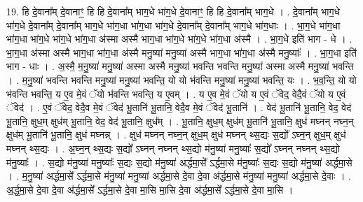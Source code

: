 \documentclass[17pt]{extarticle}
\begin{document}
19. हि दे॒वाना᳚म् दे॒वानाꣳ॒॒ हि हि दे॒वाना᳚म् भाग॒धे भा॑ग॒धे दे॒वानाꣳ॒॒ हि हि दे॒वाना᳚म् भाग॒धे । . दे॒वाना᳚म् भाग॒धे भा॑ग॒धे दे॒वाना᳚म् दे॒वाना᳚म् भाग॒धे भा॑ग॒धा भा॑ग॒धा भा॑ग॒धे दे॒वाना᳚म् दे॒वाना᳚म् भाग॒धे भा॑ग॒धाः । . भा॒ग॒धे भा॑ग॒धा भा॑ग॒धा भा॑ग॒धे भा॑ग॒धे भा॑ग॒धा अ॑स्मा अस्मै भाग॒धा भा॑ग॒धे भा॑ग॒धे भा॑ग॒धा अ॑स्मै । . भा॒ग॒धे इति॑ भाग - धे । . भा॒ग॒धा अ॑स्मा अस्मै भाग॒धा भा॑ग॒धा अ॑स्मै मनु॒ष्या॑ मनु॒ष्या॑ अस्मै भाग॒धा भा॑ग॒धा अ॑स्मै मनु॒ष्याः᳚ । . भा॒ग॒धा इति॑ भाग - धाः । . अ॒स्मै॒ म॒नु॒ष्या॑ मनु॒ष्या॑ अस्मा अस्मै मनु॒ष्या॑ भवन्ति भवन्ति मनु॒ष्या॑ अस्मा अस्मै मनु॒ष्या॑ भवन्ति । . म॒नु॒ष्या॑ भवन्ति भवन्ति मनु॒ष्या॑ मनु॒ष्या॑ भवन्ति॒ यो यो भ॑वन्ति मनु॒ष्या॑ मनु॒ष्या॑ भवन्ति॒ यः । . भ॒व॒न्ति॒ यो यो भ॑वन्ति भवन्ति॒ य ए॒व मे॒वं ॅयो भ॑वन्ति भवन्ति॒ य ए॒वम् । . य ए॒व मे॒वं ॅयो य ए॒वं ॅवेद॒ वेदै॒वं ॅयो य ए॒वं ॅवेद॑ । . ए॒वं ॅवेद॒ वेदै॒व मे॒वं ॅवेद॑ भू॒तानि॑ भू॒तानि॒ वेदै॒व मे॒वं ॅवेद॑ भू॒तानि॑ । . वेद॑ भू॒तानि॑ भू॒तानि॒ वेद॒ वेद॑ भू॒तानि॒ क्षुध॒म् क्षुध॑म् भू॒तानि॒ वेद॒ वेद॑ भू॒तानि॒ क्षुध᳚म् । . भू॒तानि॒ क्षुध॒म् क्षुध॑म् भू॒तानि॑ भू॒तानि॒ क्षुध॑ मघ्नन् नघ्न॒न् क्षुध॑म् भू॒तानि॑ भू॒तानि॒ क्षुध॑ मघ्नन्न् । . क्षुध॑ मघ्नन् नघ्न॒न् क्षुध॒म् क्षुध॑ मघ्नन् थ्स॒द्यः स॒द्यो᳚ ऽघ्न॒न् क्षुध॒म् क्षुध॑ मघ्नन् थ्स॒द्यः । . अ॒घ्न॒न् थ्स॒द्यः स॒द्यो᳚ ऽघ्नन् नघ्नन् थ्स॒द्यो म॑नु॒ष्या॑ मनु॒ष्याः᳚ स॒द्यो᳚ ऽघ्नन् नघ्नन् थ्स॒द्यो म॑नु॒ष्याः᳚ । . स॒द्यो म॑नु॒ष्या॑ मनु॒ष्याः᳚ स॒द्यः स॒द्यो म॑नु॒ष्या॑ अर्द्धमा॒से᳚ ऽर्द्धमा॒से म॑नु॒ष्याः᳚ स॒द्यः स॒द्यो म॑नु॒ष्या॑ अर्द्धमा॒से । . म॒नु॒ष्या॑ अर्द्धमा॒से᳚ ऽर्द्धमा॒से म॑नु॒ष्या॑ मनु॒ष्या॑ अर्द्धमा॒से दे॒वा दे॒वा अ॑र्द्धमा॒से म॑नु॒ष्या॑ मनु॒ष्या॑ अर्द्धमा॒से दे॒वाः । . अ॒र्द्ध॒मा॒से दे॒वा दे॒वा अ॑र्द्धमा॒से᳚ ऽर्द्धमा॒से दे॒वा मा॒सि मा॒सि दे॒वा अ॑र्द्धमा॒से᳚ ऽर्द्धमा॒से दे॒वा मा॒सि । \newline
\end{document}
